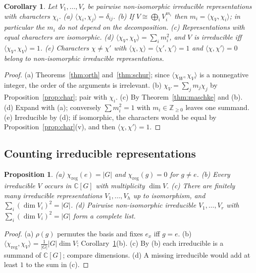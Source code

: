\documentclass[11pt]{article}
\newtheorem{proposition}[theorem]{Proposition}
\newtheorem{corollary}[theorem]{Corollary}
\theoremstyle{definition}
\theoremstyle{remark}
\newcommand{\claim}[1]{\leavevmode\marginpar{\raggedright\scriptsize\texttt{#1}}}
\newcommand{\C}{\mathbb{C}}
\newcommand{\ip}[2]{\langle #1, #2\rangle}
\begin{document}
\begin{corollary}\label{cor:orth}\claim{C-2}
Let $V_1,\dots,V_r$ be pairwise non-isomorphic irreducible representations with characters $\chi_i$.
(a) $\ip{\chi_i}{\chi_j}=\delta_{ij}$.
(b) If $V\cong\bigoplus_iV_i^{m_i}$ then $m_i=\ip{\chi_V}{\chi_i}$; in particular the $m_i$ do not depend on the decomposition.
(c) Representations with equal characters are isomorphic.
(d) $\ip{\chi_V}{\chi_V}=\sum_im_i^2$, and $V$ is irreducible iff $\ip{\chi_V}{\chi_V}=1$.
(e) Characters $\chi\neq\chi'$ with $\ip{\chi}{\chi}=\ip{\chi'}{\chi'}=1$ and $\ip{\chi}{\chi'}=0$ belong to non-isomorphic irreducible
representations.
\end{corollary}
\begin{proof}
(a) Theorems~\ref{thm:orth} and~\ref{thm:schur}; since $\ip{\chi_W}{\chi_V}$ is a nonnegative integer, the order of the arguments
is irrelevant. (b) $\chi_V=\sum_jm_j\chi_j$ by Proposition~\ref{prop:char}; pair with $\chi_i$. (c) By Theorem~\ref{thm:maschke} and (b).
(d) Expand with (a); conversely $\sum m_i^2=1$ with $m_i\in\mathbb Z_{\ge0}$ leaves one summand. (e) Irreducible by (d); if
isomorphic, the characters would be equal by Proposition~\ref{prop:char}(v), and then $\ip{\chi}{\chi'}=1$.
\end{proof}

\subsection{Counting irreducible representations}

\begin{proposition}\label{prop:reg}\claim{P-2}
(a) $\chi_{\mathrm{reg}}(e)=|G|$ and $\chi_{\mathrm{reg}}(g)=0$ for $g\neq e$. (b) Every irreducible $V$ occurs in $\C[G]$ with
multiplicity $\dim V$. (c) There are finitely many irreducible representations $V_1,\dots,V_h$ up to isomorphism, and
$\sum_i(\dim V_i)^2=|G|$. (d) Pairwise non-isomorphic irreducible $V_1,\dots,V_r$ with $\sum_i(\dim V_i)^2=|G|$ form a complete list.
\end{proposition}
\begin{proof}
(a) $\rho(g)$ permutes the basis and fixes $e_x$ iff $g=e$. (b) $\ip{\chi_{\mathrm{reg}}}{\chi_V}=\frac1{|G|}|G|\dim V$;
Corollary~\ref{cor:orth}(b). (c) By (b) each irreducible is a summand of $\C[G]$; compare dimensions. (d) A missing
irreducible would add at least $1$ to the sum in (c).
\end{proof}
\end{document}
